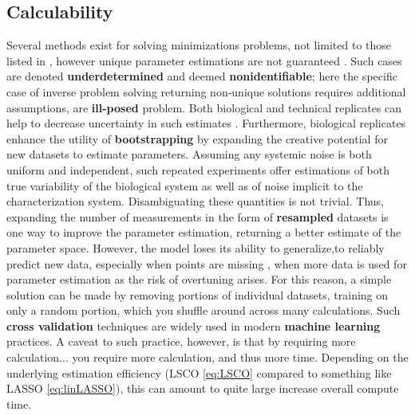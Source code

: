 \subsection{Calculability}
\label{sec:calc}
Several methods exist for solving minimizations problems, not limited to those listed in , however unique parameter estimations are not guaranteed \citep{candes2009near}. Such cases are denoted \textbf{underdetermined} and deemed \textbf{nonidentifiable}; here the specific case of inverse problem solving returning non-unique solutions requires additional assumptions, \ie are \textbf{ill-posed} problem. Both biological and technical replicates can help to decrease uncertainty in such estimates \citep{lee2000importance}. Furthermore, biological replicates enhance the utility of \textbf{bootstrapping} by expanding the creative potential for new datasets to estimate parameters. Assuming any systemic noise is both uniform and independent, such repeated experiments offer estimations of both true variability of the biological system as well as of noise implicit to the characterization system. Disambiguating these quantities is not trivial. Thus, expanding the number of measurements in the form of \textbf{resampled} datasets is one way to improve the parameter estimation, returning a better estimate of the parameter space. However, the model loses its ability to generalize,\ie to reliably predict new data, especially when points are missing \citep{folch2015enabling}, when more data is used for parameter estimation as the risk of overtuning arises. For this reason, a simple solution can be made by removing portions of individual datasets, training on only a random portion, which you shuffle around across many calculations. Such \textbf{cross validation} techniques are widely used in modern \textbf{machine learning} practices. A caveat to such practice, however, is that by requiring more calculation... you require more calculation, and thus more time. Depending on the underlying estimation efficiency (LSCO \cref{eq:LSCO} compared to something like LASSO \cref{eq:linLASSO}), this can amount to quite large increase overall compute time.



